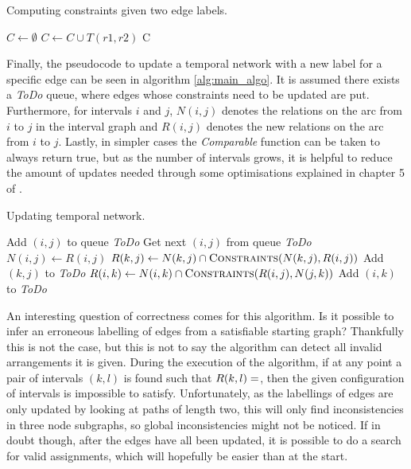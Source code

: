 \begin{algorithm}
  \caption{Computing constraints given two edge labels. \cite{allen83}}\label{alg:constraints}
  \begin{algorithmic}
    \State $C \gets \emptyset$
        \State $C \gets C \cup T(r1,r2)$
      \EndFor
    \EndFor
    \State \Return C
    \EndFunction
  \end{algorithmic}
\end{algorithm}

Finally, the pseudocode to update a temporal network with a new label for a specific edge can be
seen in algorithm \ref{alg:main_algo}. It is assumed there exists a \textit{ToDo} queue,
where edges whose constraints need to be updated are put. Furthermore, for
intervals $i$ and $j$, $N(i,j)$ denotes the relations on the arc from $i$ to $j$ in the interval
graph and $R(i,j)$ denotes the new relations on the arc from $i$ to $j$. Lastly, in simpler cases
the \textit{Comparable} function can be taken to always return true, but as the number of
intervals grows, it is helpful to reduce the amount of updates needed through some optimisations
explained in chapter 5 of \cite{allen83}.

\begin{algorithm}
  \caption{Updating temporal network. \cite{allen83}}\label{alg:main_algo}
  \begin{algorithmic}
      \State Add $(i,j)$ to queue \textit{ToDo}
        \State Get next $(i,j)$ from queue \textit{ToDo}
        \State $N(i,j) \gets R(i,j)$
          \State $R(k, j) \gets N(k,j) \cap \Call{Constraints}{N(k,j), R(i,j)}$
            \State Add $(k,j)$ to \textit{ToDo}
          \EndIf
        \EndFor
          \State $R(i, k) \gets N(i,k) \cap \Call{Constraints}{R(i,j), N(j,k)}$
            \State Add $(i,k)$ to \textit{ToDo}
          \EndIf
        \EndFor
      \EndWhile
    \EndProcedure
  \end{algorithmic}
\end{algorithm}

An interesting question of correctness comes for this algorithm. Is it possible to infer an
erroneous labelling of edges from a satisfiable starting graph? Thankfully this is not the case,
but this is not to say the algorithm can detect all invalid arrangements it is given. During the
execution of the algorithm, if at any point a pair of intervals $(k,l)$ is found such
that $R(k,l) = \empty$, then the given configuration of intervals is impossible to satisfy.
Unfortunately, as the labellings of edges are only updated by looking at paths of length two,
this will only find inconsistencies in three node subgraphs, so global inconsistencies might
not be noticed. If in doubt though, after the edges have all been updated, it is possible to
do a search for valid assignments, which will hopefully be easier than at the start.

